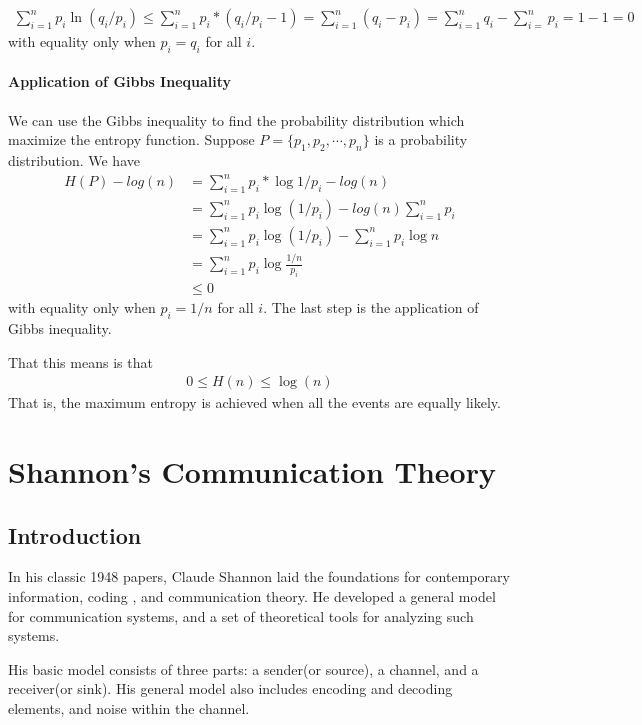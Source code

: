 \documentclass[10 pt,final]{article}
\newcommand{\impo}[1]{{\color{magenta} #1}}
\begin{document}
\impo{
\begin{align*}
\sum^n_{i=1} p_i \ln(q_i/p_i) \leq \sum^n_{i=1} p_i*(q_i/p_i -1) = \sum^n_{i=1} (q_i-p_i) = \sum^n_{i=1} q_i - \sum^n_{i=}p_i = 1 - 1 =0
\end{align*}
with equality only when $p_i = q_i$ for all $i$. }

\paragraph{Application of Gibbs Inequality} We can use the Gibbs inequality to find the probability distribution which maximize the entropy function. Suppose $P=\{p_1, p_2, \cdots, p_n\}$ is a probability distribution. We have
\begin{align*}
H(P) - log(n) & = \sum^n_{i=1} p_i *\log{1/p_i} - log(n) \\
& = \sum^n_{i=1} p_i \log(1/p_i) - log(n) \sum^n_{i=1} p_i \\
& = \sum^n_{i=1} p_i \log(1/p_i) - \sum^n_{i=1} p_i \log{n} \\
& = \sum^n_{i=1} p_i \log{\frac{1/n}{p_i}} \\
& \leq 0
\end{align*}
with equality only when $p_i = 1/n$ for all $i$. The last step is the application of Gibbs inequality.

That this means is that 
\impo{
\begin{align*}
0 \leq H(n) \leq \log(n)
\end{align*}
}
That is, the maximum entropy is achieved when all the events are equally likely.

\section{Shannon's Communication Theory}
\subsection{Introduction}
In his classic 1948 papers, Claude Shannon laid the foundations for contemporary information, coding , and communication theory. He developed a general model for communication systems, and a set of theoretical tools for analyzing such systems. 

His \impo{basic model} consists of three parts: a sender(or source), a channel, and a receiver(or sink). His general model also includes encoding and decoding elements, and noise within the channel.
\end{document}
